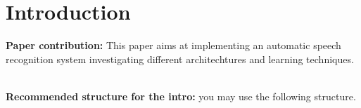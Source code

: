 
\section{Introduction}
\label{sec:introduction}

\begin{remark}
\textbf{Paper contribution:} This paper aims at implementing an automatic speech recognition system investigating different architechtures and learning techniques. 
\end{remark}

\\

\noindent \textbf{Recommended structure for the intro:} you may use the following structure. 

